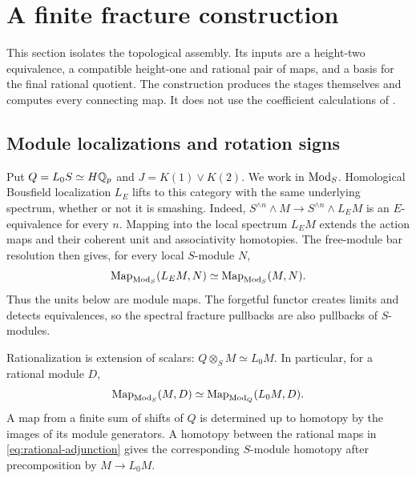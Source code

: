 \section{A finite fracture construction}\label{sec:fracture}

This section isolates the topological assembly.  Its inputs are a
height-two equivalence, a compatible height-one and rational pair of
maps, and a basis for the final rational quotient.  The construction
produces the stages themselves and computes every connecting map.
It does not use the coefficient calculations of
.

\subsection{Module localizations and rotation signs}

Put \(Q=L_0S\simeq H\mathbb Q_p\) and \(J=K(1)\vee K(2)\).
We work in \(\operatorname{Mod}_S\).  Homological Bousfield localization \(L_E\)
lifts to this category with the same underlying spectrum, whether
or not it is smashing.  Indeed,
\(S^{\wedge n}\wedge M\to S^{\wedge n}\wedge L_EM\) is an
\(E\)-equivalence for every \(n\).  Mapping into the local
spectrum \(L_EM\) extends the action maps and their coherent unit
and associativity homotopies.  The free-module bar resolution
then gives, for every local \(S\)-module \(N\),
\begin{equation}\label{eq:module-localization}
 \operatorname{Map}_{\operatorname{Mod}_S}(L_EM,N)\simeq\operatorname{Map}_{\operatorname{Mod}_S}(M,N).
\end{equation}
Thus the units below are module maps.  The forgetful functor creates
limits and detects equivalences, so the spectral fracture pullbacks
are also pullbacks of \(S\)-modules.

Rationalization is extension of scalars:
\(Q\otimes_SM\simeq L_0M\).  In particular, for a rational
module \(D\),
\begin{equation}\label{eq:rational-adjunction}
 \operatorname{Map}_{\operatorname{Mod}_S}(M,D)
   \simeq\operatorname{Map}_{\operatorname{Mod}_Q}(L_0M,D).
\end{equation}
A map from a finite sum of shifts of \(Q\) is determined up to
homotopy by the images of its module generators.  A homotopy between
the rational maps in \eqref{eq:rational-adjunction} gives the
corresponding \(S\)-module homotopy after precomposition by
\(M\to L_0M\).

